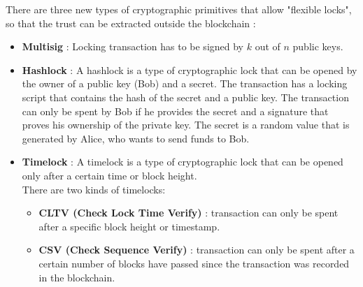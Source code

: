 There are three new types of cryptographic primitives that allow "flexible locks", so that the trust can be extracted outside the blockchain :
\begin{itemize}
	\item \textbf{Multisig} : Locking transaction has to be signed by $k$ out of $n$ public keys.
	\item \textbf{Hashlock} : A hashlock is a type of cryptographic lock that can be opened by the owner of a public key (Bob) and a secret. The transaction has a locking script that contains the hash of the secret and a public key. The transaction can only be spent by Bob if he provides the secret and a signature that proves his ownership of the private key. The secret is a random value that is generated by Alice, who wants to send funds to Bob.
	\item \textbf{Timelock} : A timelock is a type of cryptographic lock that can be opened only after a certain time or block height.\\
	There are two kinds of timelocks:
	\begin{itemize}
		\item \textbf{CLTV (Check Lock Time Verify)} : transaction can only be spent after a specific block height or timestamp.
		\item \textbf{ CSV (Check Sequence Verify)} :  transaction can only be spent after a certain number of blocks have passed since the transaction was recorded in the blockchain.
	\end{itemize}
\end{itemize}

